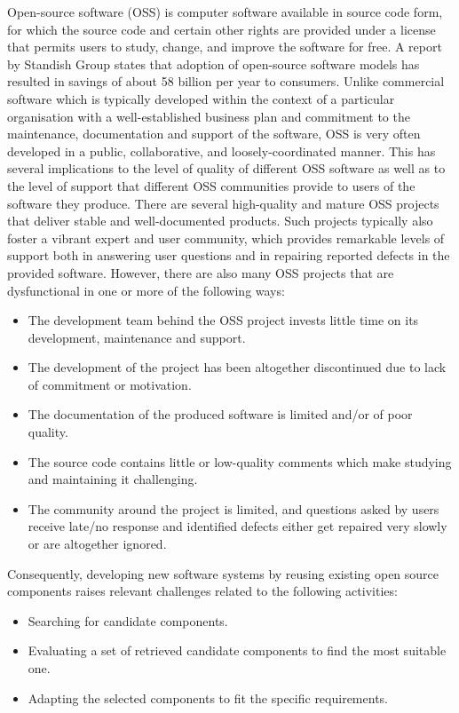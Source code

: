 Open-source software (OSS) is computer software available in source code form, for which the source code and certain other rights are provided under a license that permits users to study, change, and improve the software for free. A report by Standish Group states that adoption of open-source software models has resulted in savings of about 58 billion per year to consumers. Unlike commercial software which is typically developed within the context of a particular organisation with a well-established business plan and commitment to the maintenance, documentation and support of the software, OSS is very often developed in a public, collaborative, and loosely-coordinated manner. This has several implications to the level of quality of different OSS software as well as to the level of support that different OSS communities provide to users of the software they produce.
There are several high-quality and mature OSS projects that deliver stable and well-documented products. Such projects typically also foster a vibrant expert and user community, which provides remarkable levels of support both in answering user questions and in repairing reported defects in the provided software. However, there are also many OSS projects that are dysfunctional in one or more of the following ways:
\begin{itemize}
	\item The development team behind the OSS project invests little time on its development, maintenance and support.
	\item The development of the project has been altogether discontinued due to lack of commitment or motivation.
	\item The documentation of the produced software is limited and/or of poor quality.
	\item The source code contains little or low-quality comments which make studying and maintaining it challenging.
	\item The community around the project is limited, and questions asked by users receive late/no response and identified defects either get repaired very slowly or are altogether ignored.
\end{itemize}
Consequently, developing new software systems by reusing existing open source components raises relevant challenges related to the following activities:
\begin{itemize}
	\item Searching for candidate components.
	\item Evaluating a set of retrieved candidate components to find the most suitable one.
	\item Adapting the selected components to fit the specific requirements.
\end{itemize}

